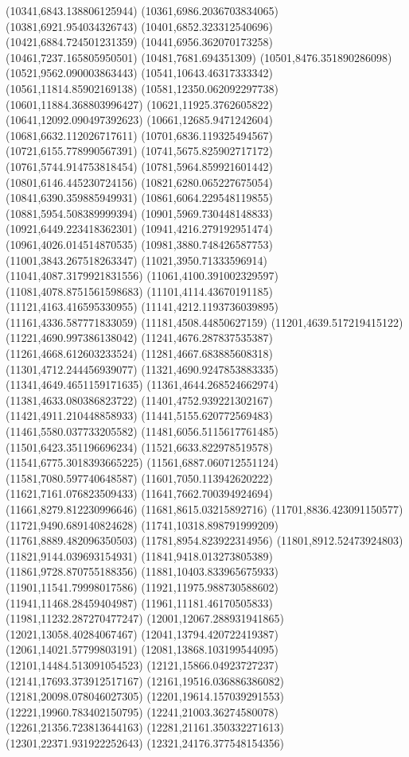 {(10341,6843.138806125944)
(10361,6986.2036703834065)
(10381,6921.954034326743)
(10401,6852.323312540696)
(10421,6884.724501231359)
(10441,6956.362070173258)
(10461,7237.165805950501)
(10481,7681.694351309)
(10501,8476.351890286098)
(10521,9562.090003863443)
(10541,10643.46317333342)
(10561,11814.85902169138)
(10581,12350.062092297738)
(10601,11884.368803996427)
(10621,11925.3762605822)
(10641,12092.090497392623)
(10661,12685.9471242604)
(10681,6632.112026717611)
(10701,6836.119325494567)
(10721,6155.778990567391)
(10741,5675.825902717172)
(10761,5744.914753818454)
(10781,5964.859921601442)
(10801,6146.445230724156)
(10821,6280.065227675054)
(10841,6390.359885949931)
(10861,6064.229548119855)
(10881,5954.508389999394)
(10901,5969.730448148833)
(10921,6449.223418362301)
(10941,4216.279192951474)
(10961,4026.014514870535)
(10981,3880.748426587753)
(11001,3843.267518263347)
(11021,3950.71333596914)
(11041,4087.3179921831556)
(11061,4100.391002329597)
(11081,4078.8751561598683)
(11101,4114.43670191185)
(11121,4163.416595330955)
(11141,4212.1193736039895)
(11161,4336.587771833059)
(11181,4508.44850627159)
(11201,4639.517219415122)
(11221,4690.997386138042)
(11241,4676.287837535387)
(11261,4668.612603233524)
(11281,4667.683885608318)
(11301,4712.244456939077)
(11321,4690.9247853883335)
(11341,4649.4651159171635)
(11361,4644.268524662974)
(11381,4633.080386823722)
(11401,4752.939221302167)
(11421,4911.210448858933)
(11441,5155.620772569483)
(11461,5580.037733205582)
(11481,6056.5115617761485)
(11501,6423.351196696234)
(11521,6633.822978519578)
(11541,6775.3018393665225)
(11561,6887.060712551124)
(11581,7080.597740648587)
(11601,7050.113942620222)
(11621,7161.076823509433)
(11641,7662.700394924694)
(11661,8279.812230996646)
(11681,8615.03215892716)
(11701,8836.423091150577)
(11721,9490.689140824628)
(11741,10318.898791999209)
(11761,8889.482096350503)
(11781,8954.823922314956)
(11801,8912.52473924803)
(11821,9144.039693154931)
(11841,9418.013273805389)
(11861,9728.870755188356)
(11881,10403.833965675933)
(11901,11541.79998017586)
(11921,11975.988730588602)
(11941,11468.28459404987)
(11961,11181.46170505833)
(11981,11232.287270477247)
(12001,12067.288931941865)
(12021,13058.40284067467)
(12041,13794.420722419387)
(12061,14021.57799803191)
(12081,13868.103199544095)
(12101,14484.513091054523)
(12121,15866.04923727237)
(12141,17693.373912517167)
(12161,19516.036886386082)
(12181,20098.078046027305)
(12201,19614.157039291553)
(12221,19960.783402150795)
(12241,21003.36274580078)
(12261,21356.723813644163)
(12281,21161.350332271613)
(12301,22371.931922252643)
(12321,24176.377548154356)
}
